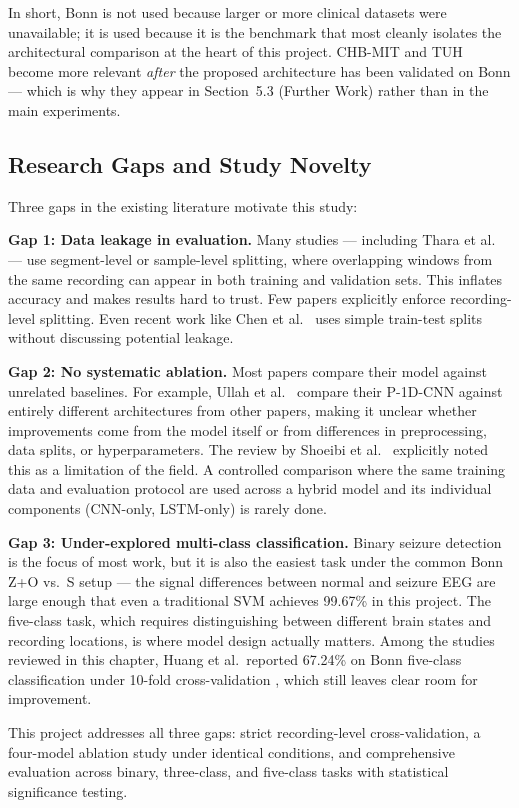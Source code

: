 In short, Bonn is not used because larger or more clinical datasets were unavailable; it is used because it is the benchmark that most cleanly isolates the architectural comparison at the heart of this project. CHB-MIT and TUH become more relevant \textit{after} the proposed architecture has been validated on Bonn --- which is why they appear in Section~5.3 (Further Work) rather than in the main experiments.

\subsection{Research Gaps and Study Novelty}

Three gaps in the existing literature motivate this study:

\textbf{Gap 1: Data leakage in evaluation.} Many studies --- including Thara et al.\ \cite{thara2019} --- use segment-level or sample-level splitting, where overlapping windows from the same recording can appear in both training and validation sets. This inflates accuracy and makes results hard to trust. Few papers explicitly enforce recording-level splitting. Even recent work like Chen et al.\ \cite{chen2023} uses simple train-test splits without discussing potential leakage.

\textbf{Gap 2: No systematic ablation.} Most papers compare their model against unrelated baselines. For example, Ullah et al.\ \cite{ullah2018} compare their P-1D-CNN against entirely different architectures from other papers, making it unclear whether improvements come from the model itself or from differences in preprocessing, data splits, or hyperparameters. The review by Shoeibi et al.\ \cite{shoeibi2021} explicitly noted this as a limitation of the field. A controlled comparison where the same training data and evaluation protocol are used across a hybrid model and its individual components (CNN-only, LSTM-only) is rarely done.

\textbf{Gap 3: Under-explored multi-class classification.} Binary seizure detection is the focus of most work, but it is also the easiest task under the common Bonn Z+O vs.\ S setup --- the signal differences between normal and seizure EEG are large enough that even a traditional SVM achieves 99.67\% in this project. The five-class task, which requires distinguishing between different brain states and recording locations, is where model design actually matters. Among the studies reviewed in this chapter, Huang et al.\ reported 67.24\% on Bonn five-class classification under 10-fold cross-validation \cite{huang2025}, which still leaves clear room for improvement.

This project addresses all three gaps: strict recording-level cross-validation, a four-model ablation study under identical conditions, and comprehensive evaluation across binary, three-class, and five-class tasks with statistical significance testing.
